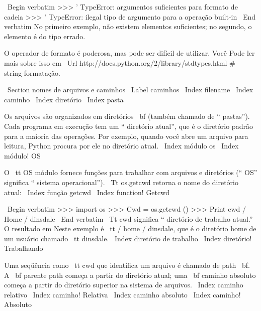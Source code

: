 \documentclass[10pt]{book}
\begin{document}
{{{{{{{{{{\ Begin {verbatim}
>>> '%
TypeError: argumentos suficientes para formato de cadeia
>>> '%
TypeError: ilegal tipo de argumento para a operação built-in
\ End {verbatim}
%
No primeiro exemplo, não existem elementos suficientes; no
segundo, o elemento é do tipo errado.

O operador de formato é poderosa, mas pode ser difícil de utilizar. Você
Pode ler mais sobre isso em
\ Url {http://docs.python.org/2/library/stdtypes.html # string-formatação}.




\ Section {nomes de arquivos e caminhos}
\ Label {caminhos}
\ Index {filename}
\ Index {caminho}
\ Index {diretório}
\ Index {pasta}

Os arquivos são organizados em diretórios {\ bf} (também chamado de `` pastas'').
Cada programa em execução tem um `` diretório atual'', que é o
diretório padrão para a maioria das operações.  
Por exemplo, quando você abre um arquivo para leitura, Python procura por ele no
diretório atual.
\ Index {módulo os}
\ Index {módulo! OS}

O {\ tt OS} módulo fornece funções para trabalhar com arquivos e
diretórios (`` OS'' significa `` sistema operacional''). {\ Tt os.getcwd}
retorna o nome do diretório atual:
\ Index {função getcwd}
\ Index {function! Getcwd}

\ Begin {verbatim}
>>> import os
>>> Cwd = os.getcwd ()
>>> Print cwd
/ Home / dinsdale
\ End {verbatim}
%
{\ Tt cwd} significa `` diretório de trabalho atual.'' O resultado em
Neste exemplo é {\ tt / home / dinsdale}, que é o diretório home de um
usuário chamado {\ tt dinsdale}.
\ Index {diretório de trabalho}
\ Index {diretório! Trabalhando}

Uma seqüência como {\ tt cwd} que identifica um arquivo é chamado de {path \ bf}.
A {\ bf parente path} começa a partir do diretório atual;
uma {\ bf caminho absoluto} começa a partir do diretório superior na
sistema de arquivos.
\ Index {caminho relativo}
\ Index {caminho! Relativa}
\ Index {caminho absoluto}
\ Index {caminho! Absoluto}

}}}}}}}}}}
\end{document}
